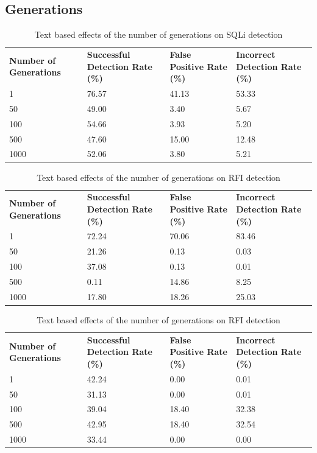 \begin{appendices}
\newpage
\subsection{Generations}

\begin{table}[hp]
	\centering
	\begin{tabular}{|p{1.5in}|p{1in}|p{1in}|p{1in}|}
	\hline
	\textbf{Number of Generations} & \textbf{Successful Detection Rate (\%)} & \textbf{False Positive Rate (\%)} & \textbf{Incorrect Detection Rate (\%)}  \\
	\hhline{|=|=|=|=|}
	1 & 76.57 & 41.13 & 53.33 \\
	\hline
	50 & 49.00 & 3.40 & 5.67 \\
	\hline
	100 & 54.66 & 3.93 & 5.20 \\
	\hline
	500 & 47.60 & 15.00 & 12.48 \\
	\hline
	1000 & 52.06 & 3.80 & 5.21 \\
	\hline
	\end{tabular}
	\caption{Text based effects of the number of generations on SQLi detection}
\end{table}

\begin{table}[h]
	\centering
	\begin{tabular}{|p{1.5in}|p{1in}|p{1in}|p{1in}|}
	\hline
	\textbf{Number of Generations} & \textbf{Successful Detection Rate (\%)} & \textbf{False Positive Rate (\%)} & \textbf{Incorrect Detection Rate (\%)}  \\
	\hhline{|=|=|=|=|}
	1 & 72.24 & 70.06 & 83.46 \\
	\hline
	50 & 21.26 & 0.13 & 0.03 \\
	\hline
	100 & 37.08 & 0.13 & 0.01 \\
	\hline
	500 & 0.11 & 14.86 & 8.25 \\
	\hline
	1000 & 17.80 & 18.26 & 25.03 \\
	\hline
	\end{tabular}
	\caption{Text based effects of the number of generations on RFI detection}
\end{table}

\begin{table}[h]
	\centering
	\begin{tabular}{|p{1.5in}|p{1in}|p{1in}|p{1in}|}
	\hline
	\textbf{Number of Generations} & \textbf{Successful Detection Rate (\%)} & \textbf{False Positive Rate (\%)} & \textbf{Incorrect Detection Rate (\%)}  \\
	\hhline{|=|=|=|=|}
	1 & 42.24 & 0.00 & 0.01 \\
	\hline
	50 & 31.13 & 0.00 & 0.01 \\
	\hline
	100 & 39.04 & 18.40 & 32.38 \\
	\hline
	500 & 42.95 & 18.40 & 32.54 \\
	\hline
	1000 & 33.44 & 0.00 & 0.00 \\
	\hline
	\end{tabular}
	\caption{Text based effects of the number of generations on RFI detection}
\end{table}


\end{appendices}
